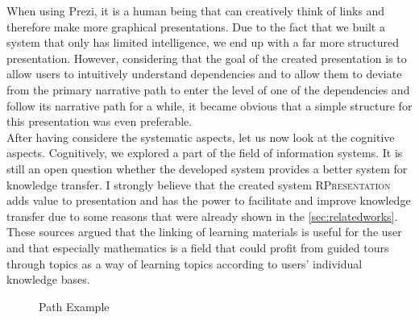 \documentclass[twoside, 12pt]{article}
\newcommand{\sys}{\textsc{RPresentation}\xspace}
\begin{document}
When using Prezi, it is a human being that can creatively think of links and therefore make more graphical presentations. Due to the fact that we built a system that only has limited intelligence, we end up with a far more structured presentation. However, considering that the goal of the created presentation is to allow users to intuitively understand dependencies and to allow them to deviate from the primary narrative path to enter the level of one of the dependencies and follow its narrative path for a while, it became obvious that a simple structure for this presentation was even preferable.\\

After having considere the systematic aspects, let us now look at the cognitive aspects. Cognitively, we explored a part of the field of information systems. It is still an open question whether the developed system provides a better system for knowledge transfer. I strongly believe that the created system \sys adds value to presentation and has the power to facilitate and improve knowledge transfer due to some reasons that were already shown in the \autoref{sec:relatedworks}. These sources argued that the linking of learning materials is useful for the user and that especially mathematics is a field that could profit from guided tours through topics as a way of learning topics according to users' individual knowledge bases.\\

\begin{figure}
\vspace{-28pt}
  \begin{center}
\vspace{-5pt}
  \caption{Path Example}
  \label{fig:pathExample}
\vspace{-24pt}
  \end{center}
\end{figure}
\end{document}
